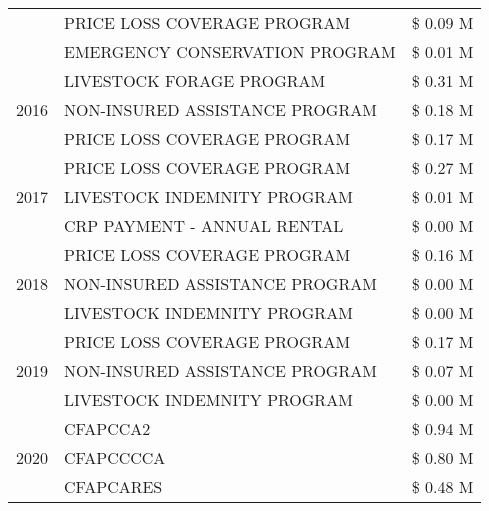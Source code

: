 \begin{tabular}{llr}
 & PRICE LOSS COVERAGE PROGRAM & \$ 0.09 M \\
 & EMERGENCY CONSERVATION PROGRAM & \$ 0.01 M \\
\cline{1-3}
\multirow[t]{3}{*}{2016} & LIVESTOCK FORAGE PROGRAM                      & \$ 0.31 M \\
 & NON-INSURED ASSISTANCE PROGRAM                & \$ 0.18 M \\
 & PRICE LOSS COVERAGE PROGRAM                   & \$ 0.17 M \\
\cline{1-3}
\multirow[t]{3}{*}{2017} & PRICE LOSS COVERAGE PROGRAM & \$ 0.27 M \\
 & LIVESTOCK INDEMNITY PROGRAM & \$ 0.01 M \\
 & CRP PAYMENT - ANNUAL RENTAL & \$ 0.00 M \\
\cline{1-3}
\multirow[t]{3}{*}{2018} & PRICE LOSS COVERAGE PROGRAM & \$ 0.16 M \\
 & NON-INSURED ASSISTANCE PROGRAM & \$ 0.00 M \\
 & LIVESTOCK INDEMNITY PROGRAM & \$ 0.00 M \\
\cline{1-3}
\multirow[t]{3}{*}{2019} & PRICE LOSS COVERAGE PROGRAM & \$ 0.17 M \\
 & NON-INSURED ASSISTANCE PROGRAM & \$ 0.07 M \\
 & LIVESTOCK INDEMNITY PROGRAM & \$ 0.00 M \\
\cline{1-3}
\multirow[t]{3}{*}{2020} & CFAPCCA2 & \$ 0.94 M \\
 & CFAPCCCCA & \$ 0.80 M \\
 & CFAPCARES & \$ 0.48 M \\
\cline{1-3}
\bottomrule
\end{tabular}
